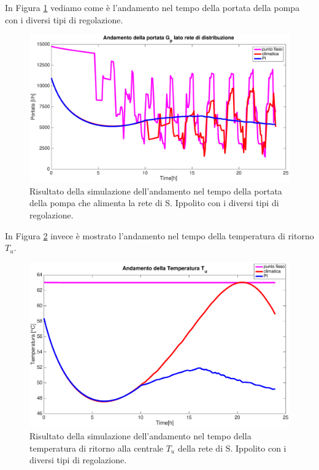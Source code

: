 \documentclass[laurea,oneside,11pt]{USiena_tesiLM3}
\begin{document}
In Figura \ref{fig:portate_confronto2} vediamo come è l'andamento nel tempo della portata della pompa con i diversi tipi di regolazione. 

\begin{figure}[!ht]
\centering
\includegraphics[width=\textwidth]{figure/portate_confronto2} 
\caption{Risultato della simulazione dell'andamento nel tempo della portata della pompa che alimenta la rete di S. Ippolito con i diversi tipi di regolazione.}
\label{fig:portate_confronto2}
\end{figure}

In Figura \ref{fig:To_confronto2} invece è mostrato l'andamento nel tempo della temperatura di ritorno $T_u$. 
\begin{figure}[!ht]
\centering
\includegraphics[width=\textwidth]{figure/To_confronto2} 
\caption{Risultato della simulazione dell'andamento nel tempo della temperatura di ritorno alla centrale $T_u$ della rete di S. Ippolito con i diversi tipi di regolazione.}
\label{fig:To_confronto2}
\end{figure}
\end{document}
